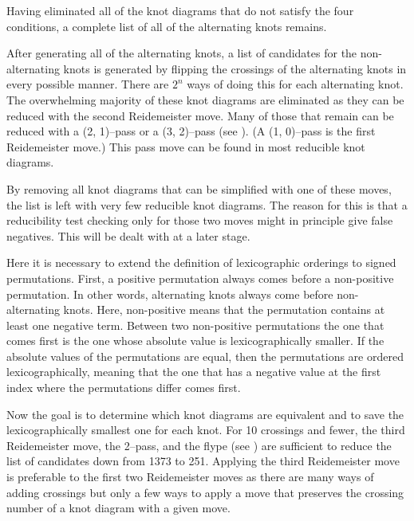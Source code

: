 \begin{paper}

Having eliminated all of the knot diagrams that do not satisfy the four
conditions, a complete list of all of the alternating knots remains.



After generating all of the alternating knots, a list of candidates for the
non-alternating knots is generated by flipping the crossings of the alternating
knots in every possible manner.
There are $2^n$ ways of doing this for each alternating  knot.
The overwhelming majority of these knot diagrams are eliminated as they can be
reduced with the second Reidemeister move.
Many of those that remain can be reduced with a (2, 1)--pass or a (3, 2)--pass
(see \figMoves).
(A (1, 0)--pass is the first Reidemeister move.)
This pass move can be found in most reducible knot diagrams.


By removing all knot diagrams that can be simplified with one of these moves,
the list is left with very few reducible knot diagrams.
The reason for this is that a reducibility test checking only for those two
moves might in principle give false negatives.
This will be dealt with at a later stage.



Here it is necessary to extend the definition of lexicographic orderings to
signed permutations.
First, a positive permutation always comes before a non-positive permutation.
In other words, alternating knots always come before non-alternating knots.
Here, non-positive means that the permutation contains at least one negative
term.
Between two non-positive permutations the one that comes first is the one whose
absolute value is lexicographically smaller.
If the absolute values of the permutations are equal, then the permutations are
ordered lexicographically, meaning that the one that has a negative value at the
first index where the permutations differ comes first.


Now the goal is to determine which knot diagrams are equivalent and to save the
lexicographically smallest one for each knot.
For 10 crossings and fewer, the third Reidemeister move, the 2--pass, and the
flype (see \figMoves) are sufficient to reduce the list of candidates down
from 1373 to 251.
Applying the third Reidemeister move is preferable to the first two
Reidemeister moves as there are many ways of adding crossings but only a few
ways to apply a move that preserves the crossing number of a knot diagram with a
given move.


\end{paper}
